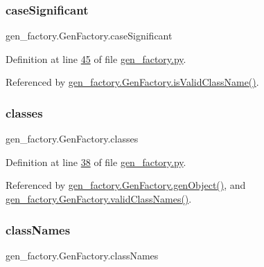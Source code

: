 \subsubsection{\texorpdfstring{case\+Significant}{caseSignificant}}
{\footnotesize\ttfamily gen\+\_\+factory.\+Gen\+Factory.\+case\+Significant}



Definition at line \hyperlink{gen__factory_8py_source_l00045}{45} of file \hyperlink{gen__factory_8py_source}{gen\+\_\+factory.\+py}.



Referenced by \hyperlink{gen__factory_8py_source_l00065}{gen\+\_\+factory.\+Gen\+Factory.\+is\+Valid\+Class\+Name()}.

\mbox{\label{classgen__factory_1_1_gen_factory_a28f3142219cbe573169e5f90508908b3}} 
\subsubsection{\texorpdfstring{classes}{classes}}
{\footnotesize\ttfamily gen\+\_\+factory.\+Gen\+Factory.\+classes}



Definition at line \hyperlink{gen__factory_8py_source_l00038}{38} of file \hyperlink{gen__factory_8py_source}{gen\+\_\+factory.\+py}.



Referenced by \hyperlink{gen__factory_8py_source_l00072}{gen\+\_\+factory.\+Gen\+Factory.\+gen\+Object()}, and \hyperlink{gen__factory_8py_source_l00062}{gen\+\_\+factory.\+Gen\+Factory.\+valid\+Class\+Names()}.

\mbox{\label{classgen__factory_1_1_gen_factory_ad263a87721215cc90b4b36e06a258a41}} 
\subsubsection{\texorpdfstring{class\+Names}{classNames}}
{\footnotesize\ttfamily gen\+\_\+factory.\+Gen\+Factory.\+class\+Names}



